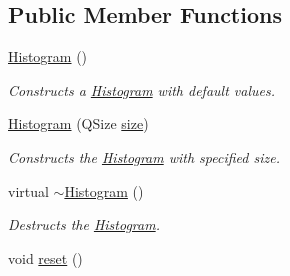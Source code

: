 \subsection*{\-Public \-Member \-Functions}
\begin{DoxyCompactItemize}
\item 
\hypertarget{classhsom_1_1_histogram_a41eb5ce79d812d39fc9d650f3b9874f7}{\hyperlink{classhsom_1_1_histogram_a41eb5ce79d812d39fc9d650f3b9874f7}{\-Histogram} ()}\label{classhsom_1_1_histogram_a41eb5ce79d812d39fc9d650f3b9874f7}

\begin{DoxyCompactList}\small\item\em \-Constructs a \hyperlink{classhsom_1_1_histogram}{\-Histogram} with default values. \end{DoxyCompactList}\item 
\hyperlink{classhsom_1_1_histogram_aff49055a52107bd97767d2eae313272a}{\-Histogram} (\-Q\-Size \hyperlink{classhsom_1_1_grid_a3e846473299eb2c7c259659eb61a6234}{size})
\begin{DoxyCompactList}\small\item\em \-Constructs the \hyperlink{classhsom_1_1_histogram}{\-Histogram} with specified size. \end{DoxyCompactList}\item 
\hypertarget{classhsom_1_1_histogram_a0b7e057690970983d770ac299076792a}{virtual \hyperlink{classhsom_1_1_histogram_a0b7e057690970983d770ac299076792a}{$\sim$\-Histogram} ()}\label{classhsom_1_1_histogram_a0b7e057690970983d770ac299076792a}

\begin{DoxyCompactList}\small\item\em \-Destructs the \hyperlink{classhsom_1_1_histogram}{\-Histogram}. \end{DoxyCompactList}\item 
\hypertarget{classhsom_1_1_histogram_ac40e46b1cfcc0761c97ec81909c2186d}{void \hyperlink{classhsom_1_1_histogram_ac40e46b1cfcc0761c97ec81909c2186d}{reset} ()}\label{classhsom_1_1_histogram_ac40e46b1cfcc0761c97ec81909c2186d}


\end{DoxyCompactItemize}
